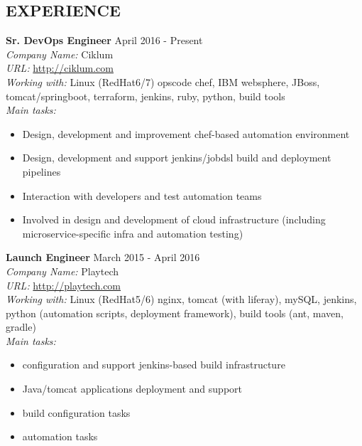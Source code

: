\documentclass[mymargin,10pt]{res} %
\begin{document}
\begin{resume}
 
\section{EXPERIENCE}

{\bf Sr. DevOps Engineer} \hfill April 2016 - Present \\
{\sl Company Name:} Ciklum \\
{\sl URL:} \url{http://ciklum.com} \\
{\sl Working with:} Linux (RedHat6/7) opscode chef, IBM websphere, JBoss, tomcat/springboot, terraform, jenkins, ruby, python, build tools \\
{\sl Main tasks:}
\begin{itemize}
\item Design, development and improvement chef-based automation environment
\item Design, development and support jenkins/jobdsl build and deployment pipelines
\item Interaction with developers and test automation teams
\item Involved in design and development of cloud infrastructure (including microservice-specific infra and automation testing)
\end{itemize}

{\bf Launch Engineer} \hfill March 2015 - April 2016 \\
{\sl Company Name:} Playtech \\
{\sl URL:} \url{http://playtech.com} \\
{\sl Working with:} Linux (RedHat5/6) nginx, tomcat (with liferay), mySQL, jenkins, python (automation scripts, deployment framework), build tools (ant, maven, gradle) \\
{\sl Main tasks:}
\begin{itemize}
\item configuration and support jenkins-based build infrastructure
\item Java/tomcat applications deployment and support
\item build configuration tasks
\item automation tasks
\end{itemize}


\end{resume}
\end{document}

